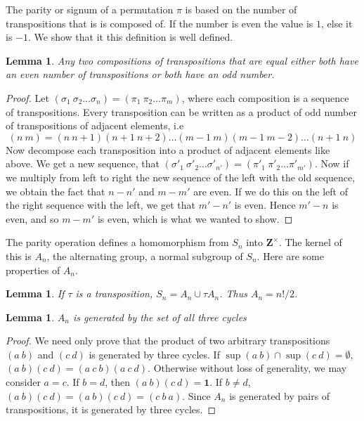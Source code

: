 \documentclass[12pt]{report}
\newtheorem{lemma}[theorem]{Lemma}
\begin{document}
The parity or signum of a permutation $\pi$ is based on the number of transpositions that is is composed of. If the number is even the value is $1$, else it is $-1$. We show that it this definition is well defined.

\begin{lemma}
    Any two compositions of transpositions that are equal either both have an even number of transpositions or both have an odd number.
\end{lemma}
\begin{proof}
    Let $(\sigma_1\ \sigma_2\dots\sigma_n) = (\pi_1\ \pi_2\dots\pi_m)$, where each composition is a sequence of transpositions. Every transposition can be written as a product of odd number of transpositions of adjacent elements, i.e
    \[ (n\ m) = (n\ n+1)(n+1\ n+2)\dots(m-1\ m)(m-1\ m-2)\dots(n+1\ n) \]
    Now decompose each transposition into a product of adjacent elements like above. We get a new sequence, that $(\sigma'_1\ \sigma'_2\dots\sigma'_{n'}) = (\pi'_1\ \pi'_2\dots\pi'_{m'})$. Now if we multiply from left to right the new sequence of the left with the old sequence, we obtain the fact that $n - n'$ and $m - m'$ are even. If we do this on the left of the right sequence with the left, we get that $m' - n'$ is even. Hence $m' - n$ is even, and so $m - m'$ is even, which is what we wanted to show.
\end{proof}

The parity operation defines a homomorphism from $S_n$ into $\mathbf{Z}^\times$. The kernel of this is $A_n$, the alternating group, a normal subgroup of $S_n$. Here are some properties of $A_n$.

\begin{lemma} If $\tau$ is a transposition, $S_n = A_n \cup \tau A_n$. Thus $A_n = n!/2$. \end{lemma}

\begin{lemma} $A_n$ is generated by the set of all three cycles \end{lemma}
\begin{proof}
    We need only prove that the product of two arbitrary transpositions $(a\ b)$ and $(c\ d)$ is generated by three cycles. If $\sup(a\ b) \cap \sup(c\ d) = \emptyset$, $(a\ b)(c\ d) = (a\ c\ b)(a\ c\ d)$. Otherwise without loss of generality, we may consider $a = c$. If $b = d$, then $(a\ b)(c\ d) = \mathbf{1}$. If $b \neq d$, $(a\ b)(c\ d) = (a\ b)(c\ d) = (c\ b\ a)$. Since $A_n$ is generated by pairs of transpositions, it is generated by three cycles.
\end{proof}
\end{document}
